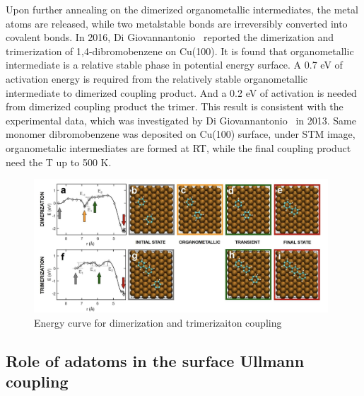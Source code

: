 \documentclass[aps,reprint,amsmath,amssymb]{revtex4-2}
\begin{document}
Upon further annealing on the dimerized organometallic intermediates, the metal atoms are released, while two metalstable bonds are irreversibly converted into covalent bonds. In 2016, Di Giovannantonio~\cite{jacs2016} reported the dimerization and trimerization of 1,4-dibromobenzene on Cu(100). It is found that organometallic intermediate is a relative stable phase in potential energy surface. A 0.7 eV of activation energy is required from the relatively stable organometallic intermediate to dimerized coupling product. And a 0.2 eV of activation is needed from dimerized coupling product the trimer. This result is consistent with the experimental data, which was investigated by Di Giovannantonio~\cite{acsnano2013} in 2013. Same monomer dibromobenzene was deposited on Cu(100) surface, under STM image, organometalic intermediates are formed at RT, while the final coupling product need the T up to 500 K.

\begin{figure}[ht]
\centering
\includegraphics[width=0.98\textwidth]{Fig/Dimer_trimer.png}
\caption{Energy curve for dimerization and trimerizaiton coupling}
\label{fig:dimer}
\end{figure}


\subsection{Role of adatoms in the surface Ullmann coupling} 
\end{document}
